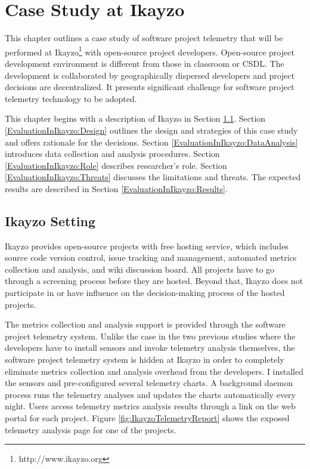 \chapter{Case Study at Ikayzo} \label{Chapter:EvaluationInIkayzo}

This chapter outlines a case study of software project telemetry that will be performed at Ikayzo\footnote{http://www.ikayzo.org} with open-source project developers. Open-source project development environment is different from those in classroom or CSDL. The development is collaborated by geographically dispersed developers and project decisions are decentralized. It presents significant challenge for software project telemetry technology to be adopted.

This chapter begins with a description of Ikayzo in Section \ref{EvaluationInIkayzo:Setting}.
Section \ref{EvaluationInIkayzo:Design} outlines the design and strategies of this case study and offers rationale for the decisions.
Section \ref{EvaluationInIkayzo:DataAnalysis} introduces data collection and analysis procedures.
Section \ref{EvaluationInIkayzo:Role} describes researcher's role.
Section \ref{EvaluationInIkayzo:Threats} discusses the limitations and threats. 
The expected results are described in Section \ref{EvaluationInIkayzo:Results}. 



 
\section{Ikayzo Setting} \label{EvaluationInIkayzo:Setting}

Ikayzo provides open-source projects with free hosting service, which includes source code version control, issue tracking and management, automated metrics collection and analysis, and wiki discussion board. All projects have to go through a screening process before they are hosted. Beyond that, Ikayzo does not participate in or have influence on the decision-making process of the hosted projects.

The metrics collection and analysis support is provided through the software project telemetry system. Unlike the case in the two previous studies where the developers have to install sensors and invoke telemetry analysis themselves, the software project telemetry system is hidden at Ikayzo in order to completely eliminate metrics collection and analysis overhead from the developers. I installed the sensors and pre-configured several telemetry charts. A background daemon process runs the telemetry analyses and updates the charts automatically every night. Users access telemetry metrics analysis results through a link on the web portal for each project. Figure \ref{fig:IkayzoTelemetryReport} shows the exposed telemetry analysis page for one of the projects.

